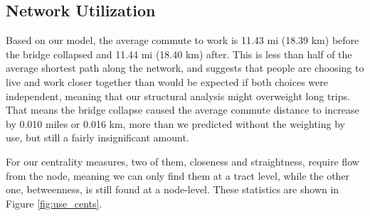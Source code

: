 \documentclass[11pt]{article}
\numberwithin{equation}{section} %
\numberwithin{figure}{section} %
\numberwithin{table}{section} %
\theoremstyle{definition}
\begin{document}
\subsection{Network Utilization}

Based on our model, the average commute to work is 11.43 mi (18.39 km) before the bridge collapsed and 11.44 mi (18.40 km) after. This is less than half of the average shortest path along the network, and suggests that people are choosing to live and work closer together than would be expected if both choices were independent, meaning that our structural analysis might overweight long trips. That means the bridge collapse caused the average commute distance to increase by 0.010 miles or 0.016 km, more than we predicted without the weighting by use, but still a fairly insignificant amount.

For our centrality measures, two of them, closeness and straightness, require flow from the node, meaning we can only find them at a tract level, while the other one, betweenness, is still found at a node-level. These statistics are shown in Figure \ref{fig:use_cents}.
\end{document}
